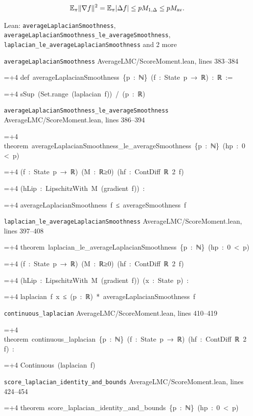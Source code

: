 \documentclass[11pt,a4paper]{report}
\newlength{\leancharwidth}
\newenvironment{leancode}{\par\smallskip\begingroup\ttfamily\footnotesize\raggedright
  \settowidth{\leancharwidth}{M}\setlength{\parskip}{0pt}\setlength{\parindent}{0pt}
  \frenchspacing}{\par\endgroup\smallskip}
\newcommand{\leanline}[2]{\hangindent=\dimexpr#1\leancharwidth+4\leancharwidth\relax
  \hangafter=1\noindent\hspace*{#1\leancharwidth}#2\par}
\newcommand{\leansource}[1]{\par{\footnotesize\color{leanmuted}#1}\par}
\begin{document}
\[\mathbb E_\pi\|\nabla f\|^2=\mathbb E_\pi|\Delta f|\le pM_{1,\Delta}\le pM_{\rm av}.\]\begin{leanbox}{Lean: \texttt{averageLaplacianSmoothness}, \texttt{averageLaplacianSmoothness\_\allowbreak{}le\_\allowbreak{}averageSmoothness}, \texttt{laplacian\_\allowbreak{}le\_\allowbreak{}averageLaplacianSmoothness} and 2 more}
\leansource{\texttt{averageLaplacianSmoothness} \quad AverageLMC/\allowbreak{}ScoreMoment.lean, lines 383–384}
\begin{leancode}
\leanline{0}{def\ averageLaplacianSmoothness\ \{p\ :\ ℕ\}\ (f\ :\ State\ p\ →\ ℝ)\ :\ ℝ\ :=}
\leanline{2}{sSup\ (Set.range\ (laplacian\ f))\ /\ (p\ :\ ℝ)}
\end{leancode}
\leansource{\texttt{averageLaplacianSmoothness\_\allowbreak{}le\_\allowbreak{}averageSmoothness} \quad AverageLMC/\allowbreak{}ScoreMoment.lean, lines 386–394}
\begin{leancode}
\leanline{0}{theorem\ averageLaplacianSmoothness\_le\_averageSmoothness\ \{p\ :\ ℕ\}\ (hp\ :\ 0\ <\ p)}
\leanline{4}{(f\ :\ State\ p\ →\ ℝ)\ (M\ :\ ℝ≥0)\ (hf\ :\ ContDiff\ ℝ\ 2\ f)}
\leanline{4}{(hLip\ :\ LipschitzWith\ M\ (gradient\ f))\ :}
\leanline{4}{averageLaplacianSmoothness\ f\ ≤\ averageSmoothness\ f}
\end{leancode}
\leansource{\texttt{laplacian\_\allowbreak{}le\_\allowbreak{}averageLaplacianSmoothness} \quad AverageLMC/\allowbreak{}ScoreMoment.lean, lines 397–408}
\begin{leancode}
\leanline{0}{theorem\ laplacian\_le\_averageLaplacianSmoothness\ \{p\ :\ ℕ\}\ (hp\ :\ 0\ <\ p)}
\leanline{4}{(f\ :\ State\ p\ →\ ℝ)\ (M\ :\ ℝ≥0)\ (hf\ :\ ContDiff\ ℝ\ 2\ f)}
\leanline{4}{(hLip\ :\ LipschitzWith\ M\ (gradient\ f))\ (x\ :\ State\ p)\ :}
\leanline{4}{laplacian\ f\ x\ ≤\ (p\ :\ ℝ)\ *\ averageLaplacianSmoothness\ f}
\end{leancode}
\leansource{\texttt{continuous\_\allowbreak{}laplacian} \quad AverageLMC/\allowbreak{}ScoreMoment.lean, lines 410–419}
\begin{leancode}
\leanline{0}{theorem\ continuous\_laplacian\ \{p\ :\ ℕ\}\ (f\ :\ State\ p\ →\ ℝ)\ (hf\ :\ ContDiff\ ℝ\ 2\ f)\ :}
\leanline{4}{Continuous\ (laplacian\ f)}
\end{leancode}
\leansource{\texttt{score\_\allowbreak{}laplacian\_\allowbreak{}identity\_\allowbreak{}and\_\allowbreak{}bounds} \quad AverageLMC/\allowbreak{}ScoreMoment.lean, lines 424–454}
\begin{leancode}
\leanline{0}{theorem\ score\_laplacian\_identity\_and\_bounds\ \{p\ :\ ℕ\}\ (hp\ :\ 0\ <\ p)}

\end{leancode}
\end{leanbox}
\end{document}

